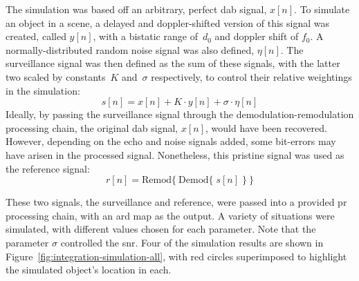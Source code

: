 \documentclass[class=report,11pt,crop=false]{standalone}
\begin{document}
The simulation was based off an arbitrary, perfect \gls{dab} signal, \(x[n]\). To simulate an object in a scene, a delayed and doppler-shifted version of this signal was created, called \(y[n]\), with a bistatic range of~\(d_0\) and doppler shift of \(f_0\). A normally-distributed random noise signal was also defined, \(\eta[n]\). The surveillance signal was then defined as the sum of these signals, with the latter two scaled by constants~\(K\) and~\(\sigma\) respectively, to control their relative weightings in the simulation:
\begin{equation}
    s[n] = x[n] + K \cdot y[n] + \sigma \cdot \eta[n]
\end{equation}
Ideally, by passing the surveillance signal through the demodulation-remodulation processing chain, the original \gls{dab} signal, \(x[n]\), would have been recovered. However, depending on the echo and noise signals added, some bit-errors may have arisen in the processed signal. Nonetheless, this pristine signal was used as the reference signal:
\begin{equation}
    r[n] = \mathrm{Remod}\bigg\{\:\mathrm{Demod}\Big\{\; s[n]\;\Big\}\:\bigg\}
\end{equation}

These two signals, the surveillance and reference, were passed into a provided \gls{pr} processing chain, with an \gls{ard} map as the output. A variety of situations were simulated, with different values chosen for each parameter. Note that the parameter \(\sigma\) controlled the \gls{snr}. Four of the simulation results are shown in Figure~\ref{fig:integration-simulation-all}, with red circles superimposed to highlight the simulated object's location in each.
\end{document}

